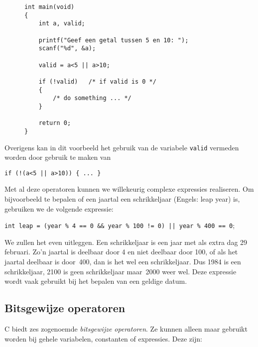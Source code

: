 \begin{figure}[!ht]
\begin{lstlisting}[caption=Voorbeeld van de negatieoperator.,label=cod:varnegop]
int main(void)
{
    int a, valid;
    
    printf("Geef een getal tussen 5 en 10: ");
    scanf("%d", &a);
    
    valid = a<5 || a>10;

    if (!valid)   /* if valid is 0 */
    {
        /* do something ... */
    }

    return 0;
}
\end{lstlisting}
\end{figure}

Overigens kan in dit voorbeeld het gebruik van de variabele \texttt{valid} vermeden worden door gebruik te maken van

\begin{lstlisting}[style=lstoneline]
if (!(a<5 || a>10)) { ... }
\end{lstlisting}

Met al deze operatoren kunnen we willekeurig complexe expressies realiseren. Om bijvoorbeeld te bepalen of een jaartal een schrikkeljaar (Engels: leap year) is, gebruiken we de volgende expressie:

\hspace*{1em}\texttt{int leap = (year \% 4 == 0 \&\& year \% 100 != 0) || year \% 400 == 0};

We zullen het even uitleggen. Een schrikkeljaar is een jaar met als extra dag 29 februari. Zo'n jaartal is deelbaar door 4 en niet deelbaar door 100, of als het jaartal deelbaar is door~400, dan is het wel een schrikkeljaar. Dus 1984 is een schrikkeljaar, 2100 is geen schrikkeljaar maar~2000 weer wel. Deze expressie wordt vaak gebruikt bij het bepalen van een geldige datum.

\subsection{Bitsgewijze operatoren}
C biedt zes zogenoemde \textsl{bitsgewijze operatoren}. Ze kunnen alleen maar gebruikt worden bij gehele variabelen, constanten of expressies. Deze zijn:

